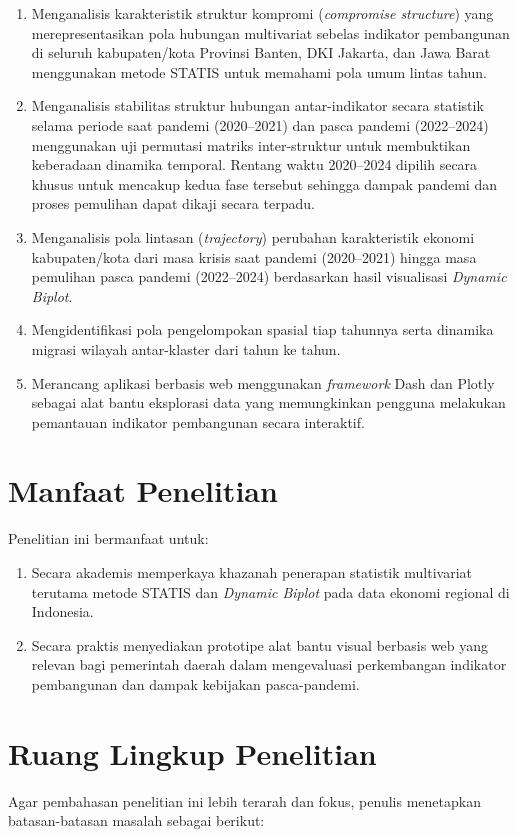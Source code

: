 \begin{enumerate}
    \item Menganalisis karakteristik struktur kompromi (\textit{compromise structure}) yang merepresentasikan pola hubungan multivariat sebelas indikator pembangunan di seluruh kabupaten/kota Provinsi Banten, DKI Jakarta, dan Jawa Barat menggunakan metode STATIS untuk memahami pola umum lintas tahun.
    \item Menganalisis stabilitas struktur hubungan antar-indikator secara statistik selama periode saat pandemi (2020--2021) dan pasca pandemi (2022--2024) menggunakan uji permutasi matriks inter-struktur untuk membuktikan keberadaan dinamika temporal. Rentang waktu 2020--2024 dipilih secara khusus untuk mencakup kedua fase tersebut sehingga dampak pandemi dan proses pemulihan dapat dikaji secara terpadu.
    \item Menganalisis pola lintasan (\textit{trajectory}) perubahan karakteristik ekonomi kabupaten/kota dari masa krisis saat pandemi (2020--2021) hingga masa pemulihan pasca pandemi (2022--2024) berdasarkan hasil visualisasi \textit{Dynamic Biplot}.
    \item Mengidentifikasi pola pengelompokan spasial tiap tahunnya serta dinamika migrasi wilayah antar-klaster dari tahun ke tahun.
    \item Merancang aplikasi berbasis web menggunakan \textit{framework} Dash dan Plotly sebagai alat bantu eksplorasi data yang memungkinkan pengguna melakukan pemantauan indikator pembangunan secara interaktif.
\end{enumerate}

\section{\normalsize Manfaat Penelitian}
Penelitian ini bermanfaat untuk:
\begin{enumerate}
    \item Secara akademis memperkaya khazanah penerapan statistik multivariat terutama metode STATIS dan \textit{Dynamic Biplot} pada data ekonomi regional di Indonesia.
    \item Secara praktis menyediakan prototipe alat bantu visual berbasis web yang relevan bagi pemerintah daerah dalam mengevaluasi perkembangan indikator pembangunan dan dampak kebijakan pasca-pandemi.
\end{enumerate}

\section{\normalsize Ruang Lingkup Penelitian}
\label{sec:ruang_lingkup}
Agar pembahasan penelitian ini lebih terarah dan fokus, penulis menetapkan batasan-batasan masalah sebagai berikut:

